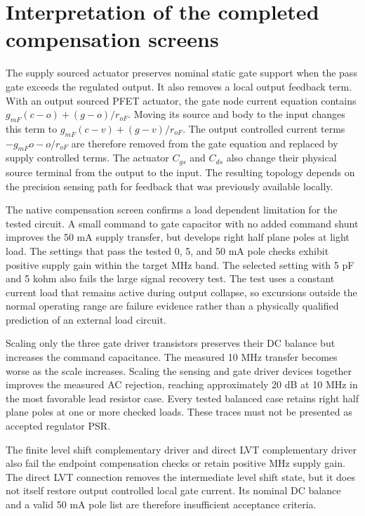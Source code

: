 \section{Interpretation of the completed compensation screens}
The supply sourced actuator preserves nominal static gate support when the pass gate exceeds the regulated output. It also removes a local output feedback term. With an output sourced PFET actuator, the gate node current equation contains $g_{mF}(c-o)+(g-o)/r_{oF}$. Moving its source and body to the input changes this term to $g_{mF}(c-v)+(g-v)/r_{oF}$. The output controlled current terms $-g_{mF}o-o/r_{oF}$ are therefore removed from the gate equation and replaced by supply controlled terms. The actuator $C_{gs}$ and $C_{ds}$ also change their physical source terminal from the output to the input. The resulting topology depends on the precision sensing path for feedback that was previously available locally.

The native compensation screen confirms a load dependent limitation for the tested circuit. A small command to gate capacitor with no added command shunt improves the 50 mA supply transfer, but develops right half plane poles at light load. The settings that pass the tested 0, 5, and 50 mA pole checks exhibit positive supply gain within the target MHz band. The selected setting with 5 pF and 5 kohm also fails the large signal recovery test. The test uses a constant current load that remains active during output collapse, so excursions outside the normal operating range are failure evidence rather than a physically qualified prediction of an external load circuit.

Scaling only the three gate driver transistors preserves their DC balance but increases the command capacitance. The measured 10 MHz transfer becomes worse as the scale increases. Scaling the sensing and gate driver devices together improves the measured AC rejection, reaching approximately 20 dB at 10 MHz in the most favorable lead resistor case. Every tested balanced case retains right half plane poles at one or more checked loads. These traces must not be presented as accepted regulator PSR.

The finite level shift complementary driver and direct LVT complementary driver also fail the endpoint compensation checks or retain positive MHz supply gain. The direct LVT connection removes the intermediate level shift state, but it does not itself restore output controlled local gate current. Its nominal DC balance and a valid 50 mA pole list are therefore insufficient acceptance criteria.

